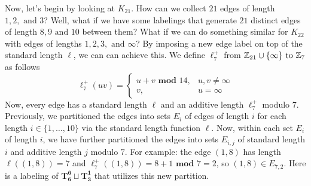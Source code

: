   Now, let's begin by looking at $K_{21}$. How can we collect $21$ edges of length $1,2,\text{ and }3$? Well, what if we have some labelings that generate $21$ distinct edges of length $8,9\text{ and }10$ between them? What if we can do something similar for $K_{22}$ with edges of lengths $1,2,3,\text{ and }\infty$? By imposing a new edge label on top of the standard length $\ell$, we can can achieve this. We define $\ell_{7}^{+}$ from $\mathbb{Z}_{21}\cup\{\infty\}\text{ to }\mathbb{Z}_{7}$ as follows
  $$\ell_{7}^{+}(uv)=\begin{cases} u+v\textbf{ mod }14, & u,v\neq \infty\\ v, &u=\infty \end{cases}$$
  Now, every edge has a standard length $\ell$ and an additive length $\ell_{7}^{+}$ modulo $7$. Previously, we partitioned the edges into sets $E_{i}$ of edges of length $i$ for each length $i\in \{1,\hdots, 10\}$ via the standard length function $\ell$. Now, within each set $E_{i}$ of length $i$, we have further partitioned the edges into sets $E_{i,j}$ of standard length $i$ and additive length $j$ modulo $7$. For example: the edge $(1,8)$ has length $\ell((1,8))=7$ and $\ell_{7}^{+}((1,8))=8+1 \textbf{ mod }7=2$, so $(1,8)\in E_{7,2}$. Here is a labeling of $\mathbf{T_{6}^{6}}\sqcup \mathbf{T_{3}^{1}}$ that utilizes this new partition.

